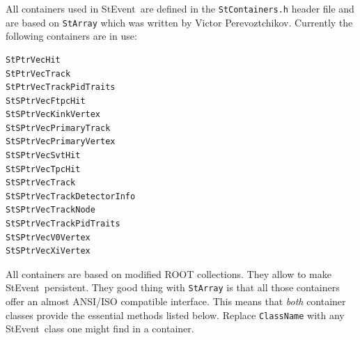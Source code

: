 \documentclass[twoside]{article}
\newcommand{\StEvent}{\textsf{StEvent}}
\begin{document}
All containers used in \StEvent\ are defined in the
\texttt{StContainers.h} header file and are based on \texttt{StArray}
which was written by Victor Perevoztchikov.  
Currently the following containers are in use:
\begin{verbatim}
StPtrVecHit
StPtrVecTrack
StPtrVecTrackPidTraits
StSPtrVecFtpcHit
StSPtrVecKinkVertex
StSPtrVecPrimaryTrack
StSPtrVecPrimaryVertex
StSPtrVecSvtHit
StSPtrVecTpcHit
StSPtrVecTrack
StSPtrVecTrackDetectorInfo
StSPtrVecTrackNode
StSPtrVecTrackPidTraits
StSPtrVecV0Vertex
StSPtrVecXiVertex
\end{verbatim}

All containers are based on modified ROOT  collections.
They allow to make \StEvent\ persistent. They good thing with
\texttt{StArray} is that all those containers offer an almost ANSI/ISO
compatible interface.  This means that \emph{both} container classes
provide the essential methods listed below. Replace \texttt{ClassName}
with any \StEvent\ class one might find in a container.
\end{document}
